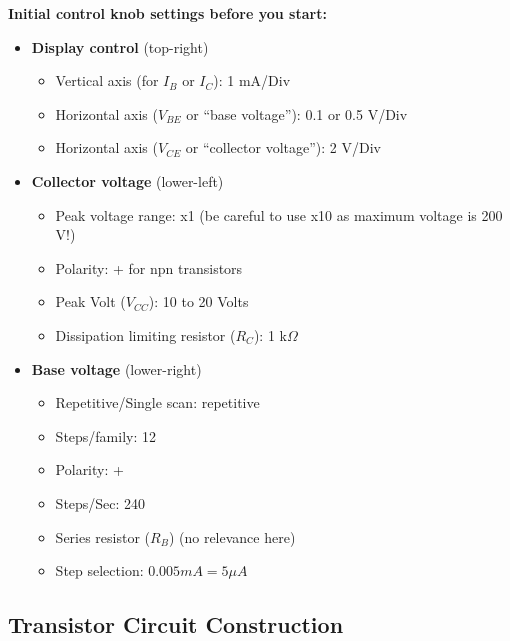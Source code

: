 {\bf Initial control knob settings before you start:}
\begin{itemize}
\item {\bf Display control} (top-right)
  \begin{itemize}
  \item Vertical axis (for $I_B$ or $I_C$): 1 mA/Div
  \item Horizontal axis ($V_{BE}$ or ``base voltage''): 0.1 or 0.5 V/Div
  \item Horizontal axis ($V_{CE}$ or ``collector voltage''): 2 V/Div
  \end{itemize}
\item {\bf Collector voltage} (lower-left)
  \begin{itemize}
  \item Peak voltage range: x1 (be careful to use x10 as maximum voltage is 200 V!)
  \item Polarity: + for npn transistors
  \item Peak Volt ($V_{CC}$): 10 to 20 Volts
  \item Dissipation limiting resistor ($R_C$): 1 k$\Omega$
  \end{itemize}
\item {\bf Base voltage} (lower-right)
  \begin{itemize}
  \item Repetitive/Single scan: repetitive
  \item Steps/family: 12
  \item Polarity: +
  \item Steps/Sec: 240
  \item Series resistor ($R_B$) (no relevance here)
  \item Step selection: $0.005 mA = 5 \mu A$
  \end{itemize}
\end{itemize}

\subsection{Transistor Circuit Construction}

